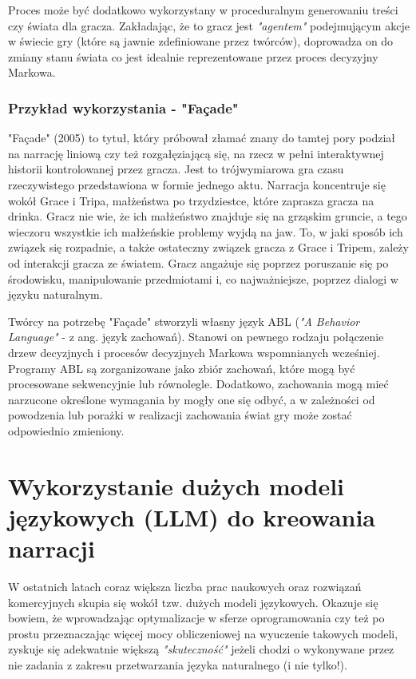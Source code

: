 Proces może być dodatkowo wykorzystany w proceduralnym generowaniu treści czy świata dla gracza.
Zakładając, że to gracz jest \textit{"agentem"} podejmującym akcje w świecie gry (które są jawnie
zdefiniowane przez twórców), doprowadza on do zmiany stanu świata co jest idealnie reprezentowane
przez proces decyzyjny Markowa\cite{automated_planning}.

\subsubsection*{Przykład wykorzystania - "Façade"}

"Façade" (2005) to tytuł, który próbował złamać znany do tamtej pory podział na narrację liniową czy też
rozgałęziającą się, na rzecz w pełni interaktywnej historii kontrolowanej przez gracza. Jest to
trójwymiarowa gra czasu rzeczywistego przedstawiona w formie jednego aktu. Narracja koncentruje się
wokół Grace i Tripa, małżeństwa po trzydziestce, które zaprasza gracza na drinka. Gracz nie wie, że ich
małżeństwo znajduje się na grząskim gruncie, a tego wieczoru wszystkie ich małżeńskie problemy wyjdą na
jaw. To, w jaki sposób ich związek się rozpadnie, a także ostateczny związek gracza z Grace i Tripem,
zależy od interakcji gracza ze światem. Gracz angażuje się poprzez poruszanie się po środowisku,
manipulowanie przedmiotami i, co najważniejsze, poprzez dialogi w języku naturalnym\cite{1024751}.

Twórcy na potrzebę "Façade" stworzyli własny język ABL (\textit{"A Behavior Language"} - z ang. język
zachowań). Stanowi on pewnego rodzaju połączenie drzew decyzjnych i procesów decyzjnych Markowa
wspomnianych wcześniej. Programy ABL są zorganizowane jako zbiór zachowań, które mogą być procesowane
sekwencyjnie lub równolegle. Dodatkowo, zachowania mogą mieć narzucone określone wymagania by
mogły one się odbyć, a w zależności od powodzenia lub porażki w realizacji zachowania świat gry
może zostać odpowiednio zmieniony.

\section{Wykorzystanie dużych modeli językowych (LLM) do kreowania narracji}\label{section:ch2_2}

W ostatnich latach coraz większa liczba prac naukowych oraz rozwiązań komercyjnych skupia się wokół
tzw. dużych modeli językowych. Okazuje się bowiem, że wprowadzając optymalizacje w sferze oprogramowania
czy też po prostu przeznaczając więcej mocy obliczeniowej na wyuczenie takowych modeli, zyskuje się
adekwatnie większą \textit{"skuteczność"} jeżeli chodzi o wykonywane przez nie zadania z zakresu
przetwarzania języka naturalnego (i nie tylko!).

